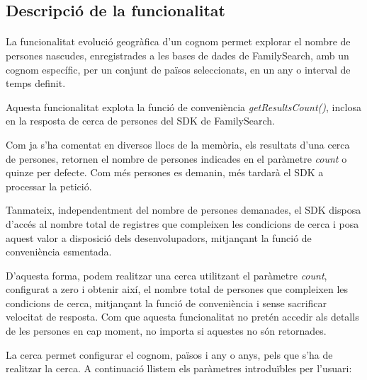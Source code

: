 \subsection{Descripció de la funcionalitat}

    \paragraph{}
    La funcionalitat evolució geogràfica d'un cognom permet explorar el nombre de persones nascudes, enregistrades a les bases de dades de FamilySearch, amb un cognom específic, per un conjunt de països seleccionats, en un any o interval de temps definit.

    Aquesta funcionalitat explota la funció de conveniència \emph{getResultsCount()}, inclosa en la resposta de cerca de persones del SDK de FamilySearch.

    Com ja s'ha comentat en diversos llocs de la memòria, els resultats d'una cerca de persones, retornen el nombre de persones indicades en el paràmetre \emph{count} o quinze per defecte. Com més persones es demanin, més tardarà el SDK a processar la petició.

    Tanmateix, independentment del nombre de persones demanades, el SDK disposa d’accés al nombre total de registres que compleixen les condicions de cerca i posa aquest valor a disposició dels desenvolupadors, mitjançant la funció de conveniència esmentada.

    D'aquesta forma, podem realitzar una cerca utilitzant el paràmetre \emph{count}, configurat a zero i obtenir així, el nombre total de persones que compleixen les condicions de cerca, mitjançant la funció de conveniència i sense sacrificar velocitat de resposta. Com que aquesta funcionalitat no pretén accedir als detalls de les persones en cap moment, no importa si aquestes no són retornades.

    La cerca permet configurar el cognom, països i any o anys, pels que s'ha de realitzar la cerca. A continuació llistem els paràmetres introduïbles per l'usuari:

